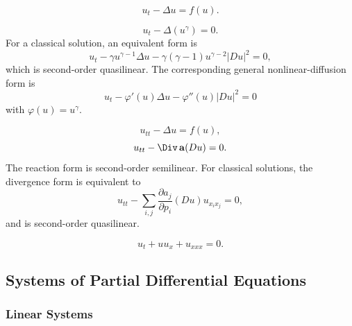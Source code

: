 \begin{example}
\label{ex:scalar-reaction-diffusion-equation}
\leanok
$$u_t - \Delta u = f(u).$$
\end{example}

\begin{example}
\label{ex:porous-medium-equation}
\leanok
$$u_t - \Delta(u^\gamma) = 0.$$
For a classical solution, an equivalent form is
$$u_t - \gamma u^{\gamma-1}\Delta u - \gamma(\gamma-1)u^{\gamma-2}|Du|^2 = 0,$$
which is second-order quasilinear. The corresponding general nonlinear-diffusion form is
$$u_t - \varphi'(u)\Delta u - \varphi''(u)|Du|^2 = 0$$
with $\varphi(u)=u^\gamma$.
\end{example}

\begin{example}
\label{ex:nonlinear-wave-equations}
\leanok
$$u_{tt} - \Delta u = f(u),$$
$$u_{tt} - \Div\,\mathbf{a}(Du) = 0.$$
The reaction form is second-order semilinear. For classical solutions, the
divergence form is equivalent to
$$u_{tt} - \sum_{i,j}\frac{\partial a_j}{\partial p_i}(Du)u_{x_i x_j} = 0,$$
and is second-order quasilinear.
\end{example}

\begin{example}
\label{ex:kdv-equation}
\leanok
$$u_t + uu_x + u_{xxx} = 0.$$
\end{example}

\subsection{Systems of Partial Differential Equations}
\label{sec:systems-of-pdes}

\subsubsection{Linear Systems}
\label{sec:examples-linear-systems}

